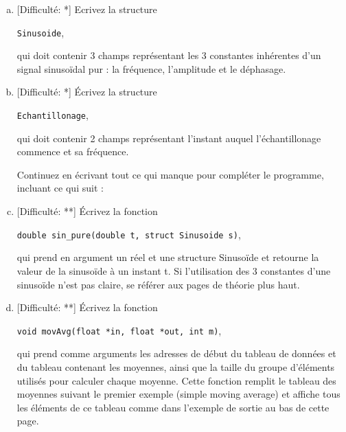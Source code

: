\documentclass[11pt]{article}
\begin{document}
\newpage
\begin{enumerate}[a)]


\item \textcolor{mygreen}{[Difficulté: *]}
Ecrivez la structure
\begin{center}
\texttt{Sinusoide}, 
\end{center}
qui doit contenir 3 champs représentant les 3 constantes inhérentes d'un signal sinusoïdal pur : la fréquence, l'amplitude et le déphasage.

\item \textcolor{mygreen}{[Difficulté: *]}
Écrivez la structure
\begin{center} 
\texttt{Echantillonage}, 
\end{center}
qui doit contenir 2 champs représentant l'instant auquel l'échantillonage commence et sa fréquence.

\vspace{20pt}
\hspace{-20pt} Continuez en écrivant tout ce qui manque pour compléter le programme, incluant ce qui suit :
\vspace{20pt}

\item \textcolor{mygreen}{[Difficulté: **]}
Écrivez la fonction
\begin{center} 
\texttt{double sin_pure(double t, struct Sinusoide s)}, 
\end{center}
qui prend en argument un réel et une structure Sinusoïde et retourne la valeur de la sinusoïde à un instant t. Si l'utilisation des 3 constantes d'une sinusoïde n'est pas claire, se référer aux pages de théorie plus haut.

\vspace{20pt}


\item \textcolor{mygreen}{[Difficulté: **]}
Écrivez la fonction 

\begin{center}
\texttt{void movAvg(float *in, float *out, int m)}, 
\end{center}

qui prend comme arguments les adresses de début du tableau de données et du tableau contenant les moyennes, ainsi que la taille du groupe d'éléments utilisés pour calculer chaque moyenne. Cette fonction remplit le tableau des moyennes suivant le premier exemple (simple moving average) et affiche tous les éléments de ce tableau comme dans l'exemple de sortie au bas de cette page.


\end{enumerate}
\end{document}
